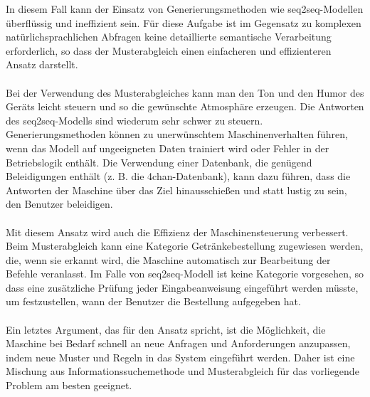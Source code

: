 In diesem Fall kann der Einsatz von Generierungsmethoden wie seq2seq-Modellen überflüssig und ineffizient sein.
Für diese Aufgabe ist im Gegensatz zu komplexen natürlichsprachlichen Abfragen keine detaillierte semantische Verarbeitung erforderlich, so dass der Musterabgleich einen einfacheren und effizienteren Ansatz darstellt.\\\\
Bei der Verwendung des Musterabgleiches kann man den Ton und den Humor des Geräts leicht steuern und so die gewünschte Atmosphäre erzeugen.
Die Antworten des seq2seq-Modells sind wiederum sehr schwer zu steuern.
Generierungsmethoden können zu unerwünschtem Maschinenverhalten führen, wenn das Modell auf ungeeigneten Daten trainiert wird oder Fehler in der Betriebslogik enthält.
Die Verwendung einer Datenbank, die genügend Beleidigungen enthält (z. B. die 4chan-Datenbank), kann dazu führen, dass die Antworten der Maschine über das Ziel hinausschießen und statt lustig zu sein, den Benutzer beleidigen.\\\\
Mit diesem Ansatz wird auch die Effizienz der Maschinensteuerung verbessert.
Beim Musterabgleich kann eine Kategorie \glqq{}Getränkebestellung\grqq{} zugewiesen werden, die, wenn sie erkannt wird, die Maschine automatisch zur Bearbeitung der Befehle veranlasst.
Im Falle von seq2seq-Modell ist keine Kategorie vorgesehen, so dass eine zusätzliche Prüfung jeder Eingabeanweisung eingeführt werden müsste, um festzustellen, wann der Benutzer die Bestellung aufgegeben hat.\\\\
Ein letztes Argument, das für den Ansatz spricht, ist die Möglichkeit, die Maschine bei Bedarf schnell an neue Anfragen und Anforderungen anzupassen, indem neue Muster und Regeln in das System eingeführt werden.
Daher ist eine Mischung aus Informationssuchemethode und Musterabgleich für das vorliegende Problem am besten geeignet.
